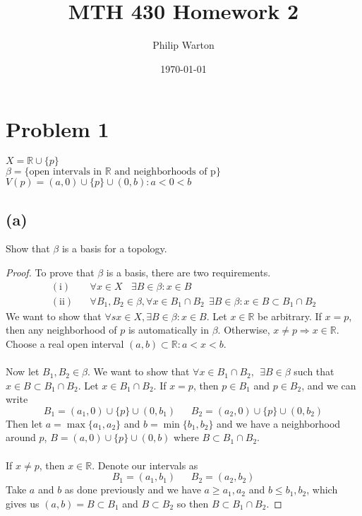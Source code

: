 \documentclass{article}
\begin{document}
\title{MTH 430 Homework 2}
\author{Philip Warton}
\date{\today}
\maketitle

\section*{Problem 1}
$X = \mathbb{R} \cup \{p\}$
\\
$\beta = \{ \text{open intervals in $\mathbb{R}$ and neighborhoods of p} \}$
\\
$V(p) = (a, 0) \cup \{p \} \cup (0, b) : a < 0 < b$
\subsection*{(a)}

Show that $\beta$ is a basis for a topology.
\begin{proof}
    To prove that $\beta$ is a basis, there are two requirements.
    \begin{align*}
        (\text{i}) & \ \ \ \ \forall x \in X \ \ \ \ \exists B \in \beta : x \in B \\
        (\text{ii}) & \ \ \ \ \forall B_1,B_2 \in \beta, \forall x \in B_1 \cap B_2 \ \ \exists B \in \beta : x \in B \subset B_1 \cap B_2
    \end{align*}
    We want to show that $\forall sx \in X, \exists B \in \beta : x \in B$.
    Let $x \in \mathbb{R}$ be arbitrary.
    If $x = p$, then any neighborhood of $p$ is automatically in $\beta$.
    Otherwise, $x \neq p \Longrightarrow x \in \mathbb{R}$.
    Choose a real open interval $(a,b) \subset \mathbb{R} : a < x < b.$
    \\\\
    Now let $B_1, B_2 \in \beta$.
    We want to show that $\forall x \in B_1 \cap B_2, \ \ \exists B \in \beta$ such that $x \in B \subset B_1 \cap B_2$.
    Let $x \in B_1 \cap B_2$.
    If $x = p$, then $p \in B_1$ and $p \in B_2$, and we can write
    \[
        B_1 = (a_1, 0) \cup \{p\} \cup (0, b_1) \ \ \ \ \ \ \ 
        B_2 = (a_2, 0) \cup \{p\} \cup (0, b_2)
    \]
    Then let $a = \max \{a_1,a_2\}$ and $b = \min \{b_1,b_2\}$ and we have a neighborhood around $p$, $B = (a,0) \cup \{p\} \cup (0,b)$ where $B \subset B_1 \cap B_2$.
    \\\\
    If $x \neq p$, then $x \in \mathbb{R}$.
    Denote our intervals as
    \[
        B_1 = (a_1, b_1) \ \ \ \ \ \ \ B_2 = (a_2, b_2)
    \]
    Take $a$ and $b$ as done previously and we have $a \geqslant a_1,a_2$ and $b \leqslant b_1,b_2$, which gives us $(a,b) = B \subset B_1$ and $B \subset B_2$ so then $B \subset B_1 \cap B_2$.
\end{proof}
\end{document}
